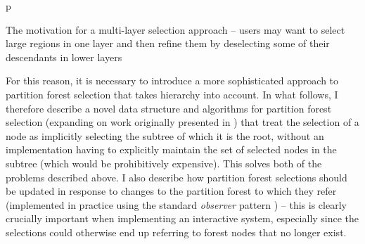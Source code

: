 \begin{stusubfig}{p}
	\hspace{4mm}%
	\hspace{4mm}%
\caption{The motivation for a multi-layer selection approach -- users may want to select large regions in one layer and then refine them by deselecting some of their descendants in lower layers}
\label{fig:ipfs-selection-multilayermotivation}
\end{stusubfig}

For this reason, it is necessary to introduce a more sophisticated approach to partition forest selection that takes hierarchy into account. In what follows, I therefore describe a novel data structure and algorithms for partition forest selection (expanding on work originally presented in \cite{gvcispa09}) that treat the selection of a node as implicitly selecting the subtree of which it is the root, without an implementation having to explicitly maintain the set of selected nodes in the subtree (which would be prohibitively expensive). This solves both of the problems described above. I also describe how partition forest selections should be updated in response to changes to the partition forest to which they refer (implemented in practice using the standard \emph{observer} pattern \cite{gamma95}) -- this is clearly crucially important when implementing an interactive system, especially since the selections could otherwise end up referring to forest nodes that no longer exist.

